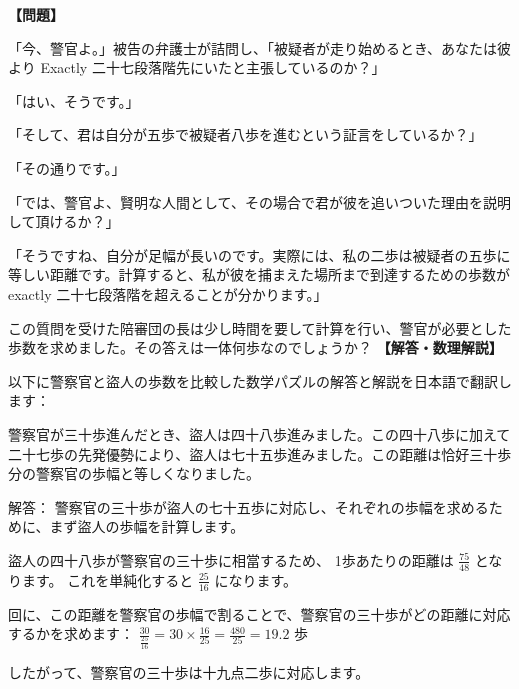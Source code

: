 \documentclass[10pt,a4paper,oneside,openany]{ltjsbook}
\begin{document}
\begin{tcolorbox}[colback=softblue,colframe=primaryblue,title=\textbf{第 104 問：CATCHING THE THIEF.},arc=2mm,boxrule=1pt,breakable]
\textbf{【問題】}\par\vspace{0.3em}
「今、警官よ。」被告の弁護士が詰問し、「被疑者が走り始めるとき、あなたは彼より Exactly 二十七段落階先にいたと主張しているのか？」

「はい、そうです。」

「そして、君は自分が五歩で被疑者八歩を進むという証言をしているか？」

「その通りです。」

「では、警官よ、賢明な人間として、その場合で君が彼を追いついた理由を説明して頂けるか？」

「そうですね、自分が足幅が長いのです。実際には、私の二歩は被疑者の五歩に等しい距離です。計算すると、私が彼を捕まえた場所まで到達するための歩数が exactly 二十七段落階を超えることが分かります。」

この質問を受けた陪審団の長は少し時間を要して計算を行い、警官が必要とした歩数を求めました。その答えは一体何歩なのでしょうか？
\tcblower
\textbf{【解答・数理解説】}\par\vspace{0.3em}
以下に警察官と盜人の歩数を比較した数学パズルの解答と解説を日本語で翻訳します：

警察官が三十歩進んだとき、盜人は四十八歩進みました。この四十八歩に加えて二十七歩の先発優勢により、盜人は七十五歩進みました。この距離は恰好三十歩分の警察官の歩幅と等しくなりました。

解答：
警察官の三十歩が盜人の七十五歩に対応し、それぞれの歩幅を求めるために、まず盜人の歩幅を計算します。

盜人の四十八歩が警察官の三十歩に相當するため、
1歩あたりの距離は \(\frac{75}{48}\) となります。
これを単純化すると \(\frac{25}{16}\) になります。

回に、この距離を警察官の歩幅で割ることで、警察官の三十歩がどの距離に対応するかを求めます：
\(\frac{30}{\frac{25}{16}} = 30 \times \frac{16}{25} = \frac{480}{25} = 19.2\) 歩

したがって、警察官の三十歩は十九点二歩に対応します。
\end{tcolorbox}
\end{document}

